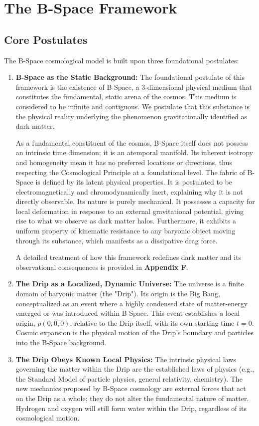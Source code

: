 \documentclass{BSpacePaper} %
\begin{document}
\section{The B-Space Framework}
\subsection{Core Postulates}
The B-Space cosmological model is built upon three foundational postulates:
\begin{enumerate}
    \item \textbf{B-Space as the Static Background:} The foundational postulate of this framework is the existence of B-Space, a 3-dimensional physical medium that constitutes the fundamental, static arena of the cosmos. This medium is considered to be infinite and contiguous. We postulate that this substance is the physical reality underlying the phenomenon gravitationally identified as dark matter.

    As a fundamental constituent of the cosmos, B-Space itself does not possess an intrinsic time dimension; it is an atemporal manifold. Its inherent isotropy and homogeneity mean it has no preferred locations or directions, thus respecting the Cosmological Principle at a foundational level. The fabric of B-Space is defined by its latent physical properties. It is postulated to be electromagnetically and chromodynamically inert, explaining why it is not directly observable. Its nature is purely mechanical. It possesses a capacity for local deformation in response to an external gravitational potential, giving rise to what we observe as dark matter halos. Furthermore, it exhibits a uniform property of kinematic resistance to any baryonic object moving through its substance, which manifests as a dissipative drag force.

    A detailed treatment of how this framework redefines dark matter and its observational consequences is provided in \textbf{Appendix F}.
    
    \item \textbf{The Drip as a Localized, Dynamic Universe:} The universe is a finite domain of baryonic matter (the "Drip"). Its origin is the Big Bang, conceptualized as an event where a highly condensed state of matter-energy emerged or was introduced within B-Space. This event establishes a local origin, $p(0,0,0)$, relative to the Drip itself, with its own starting time \textbf{$t=0$}. Cosmic expansion is the physical motion of the Drip's boundary and particles into the B-Space background.

    \item \textbf{The Drip Obeys Known Local Physics:} The intrinsic physical laws governing the matter within the Drip are the established laws of physics (e.g., the Standard Model of particle physics, general relativity, chemistry). The new mechanics proposed by B-Space cosmology are external forces that act on the Drip as a whole; they do not alter the fundamental nature of matter. Hydrogen and oxygen will still form water within the Drip, regardless of its cosmological motion.
    
\end{enumerate}
\end{document}
